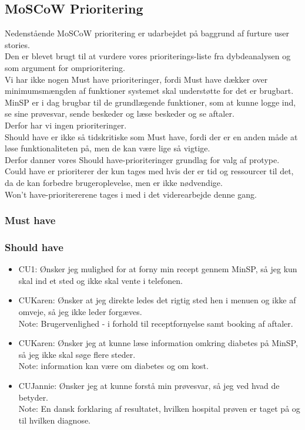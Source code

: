 \subsection{MoSCoW Prioritering}
Nedenstående MoSCoW prioritering er udarbejdet på baggrund af furture user stories.\\
Den er blevet brugt til at vurdere vores prioriterings-liste fra dybdeanalysen og som argument for omprioritering.\\
Vi har ikke nogen Must have prioriteringer, fordi Must have dækker over minimumsmængden af funktioner systemet skal understøtte for det er brugbart.\\
MinSP er i dag brugbar til de grundlægende funktioner, som at kunne logge ind, se sine prøvesvar, sende beskeder og læse beskeder og se aftaler. \\
Derfor har vi ingen prioriteringer.\\
Should have er ikke så tidskritiske som Must have, fordi der er en anden måde at løse funktionaliteten på, men de kan være lige så vigtige.\\
Derfor danner vores Should have-prioriteringer grundlag for valg af protype.\\
Could have er prioriterer der kun tages med hvis der er tid og ressourcer til det, da de kan forbedre brugeroplevelse, men er ikke nødvendige. \\
Won't have-prioritererene tages i med i det viderearbejde denne gang.
\subsubsection*{Must have}
\subsubsection*{Should have}
\begin{itemize}
\item CU1: Ønsker jeg mulighed for at forny min recept gennem MinSP, så jeg kun skal ind et sted og ikke skal vente i telefonen.
\item CUKaren: Ønsker at jeg direkte ledes det rigtig sted hen i menuen og ikke af omveje, så jeg ikke leder forgæves. \\
Note: Brugervenlighed - i forhold til receptfornyelse samt booking af aftaler.
\item CUKaren: Ønsker jeg at kunne læse information omkring diabetes på MinSP, så jeg ikke skal søge flere steder. \\
Note: information kan være om diabetes og om kost.
\item CUJannie: Ønsker jeg at kunne forstå min prøvesvar, så jeg ved hvad de betyder. \\
Note: En dansk forklaring af resultatet, hvilken hospital prøven er taget på og til hvilken diagnose.
\end{itemize}
